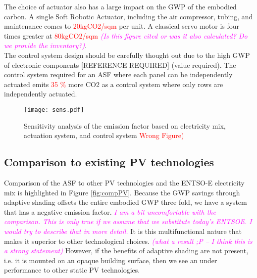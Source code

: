 The choice of actuator also has a large impact on the GWP of the embodied carbon. A single Soft Robotic Actuator, including the air compressor, tubing, and maintenance comes to \textcolor{red}{20kgCO2/sqm} per unit. A classical servo motor is four times greater at \textcolor{red}{80kgCO2/sqm} \textcolor{magenta}{\textit{(Is this figure cited or was it also calculated? Do we provide the inventory?)}}.\\

The control system design should be carefully thought out due to the high GWP of electronic components [REFERENCE REQUIRED] (value required). The control system required for an ASF where each panel can be independently actuated emits \textcolor{red}{35 \%} more CO2 as a control system where only rows are independently actuated.\\





\begin{figure}[H]
\begin{center}
\texttt{[image: sens.pdf]}
\caption{Sensitivity analysis of the emission factor based on electricity mix, actuation system, and control system \textcolor{red}{Wrong Figure)}}
\label{fig:sens}
\end{center}
\end{figure}

\subsection{Comparison to existing PV technologies}

Comparison of the ASF to other PV technologies and the ENTSO-E electricity mix is highlighted in Figure \ref{fig:compPV}. Because the GWP savings through adaptive shading offsets the entire embodied GWP three fold, we have a system that has a negative emission factor. \textcolor{magenta}{\textit{I am a bit uncomfortable with the comparison. This is only true if we assume that we substitute today's ENTSOE. I would try to describe that in more detail.}} It is this multifunctional nature that makes it superior to other technological choices. \textcolor{magenta}{\textit{(what a result ;P -- I think this is a strong statement)}} However, if the benefits of adaptive shading are not present, i.e. it is mounted on an opaque building surface, then we see an under performance to other static PV technologies. 

